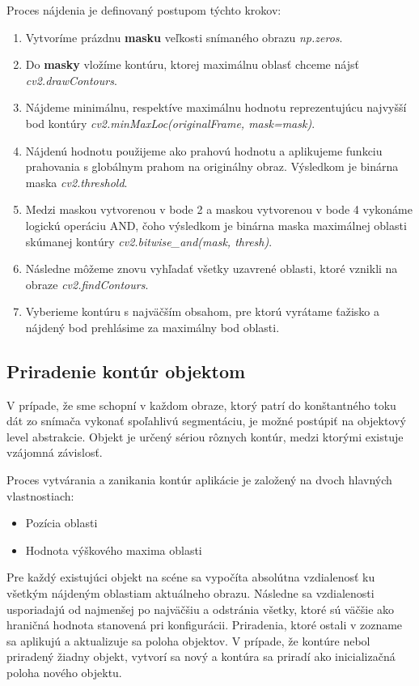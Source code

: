 Proces nájdenia je definovaný postupom týchto krokov: 
\begin{enumerate}
  \item Vytvoríme prázdnu \textbf{masku} veľkosti snímaného obrazu \textit{np.zeros}.
  \item Do \textbf{masky} vložíme kontúru, ktorej maximálnu oblasť chceme nájsť \textit{cv2.drawContours}.
  \item Nájdeme minimálnu, respektíve maximálnu hodnotu reprezentujúcu najvyšší bod kontúry  \textit{cv2.minMaxLoc(originalFrame, mask=mask)}.
  \item Nájdenú hodnotu použijeme ako prahovú hodnotu a aplikujeme funkciu prahovania s globálnym prahom na originálny obraz. Výsledkom je binárna maska \textit{cv2.threshold}.
  \item Medzi maskou vytvorenou v bode 2 a maskou vytvorenou v bode 4 vykonáme logickú operáciu AND, čoho výsledkom je binárna maska maximálnej oblasti skúmanej kontúry \textit{cv2.bitwise\_and(mask, thresh)}.
  \item Následne môžeme znovu vyhľadať všetky uzavrené oblasti, ktoré vznikli na obraze \textit{cv2.findContours}.
  \item Vyberieme kontúru s najväčším obsahom, pre ktorú vyrátame ťažisko a nájdený bod prehlásime za maximálny bod oblasti.
\end{enumerate}

\subsection{Priradenie kontúr objektom}
V prípade, že sme schopní v každom obraze, ktorý patrí do konštantného toku dát zo snímača vykonať spoľahlivú segmentáciu, je možné postúpiť na objektový level abstrakcie. Objekt je určený sériou rôznych kontúr, medzi ktorými existuje vzájomná závislosť.  

Proces vytvárania a zanikania kontúr aplikácie je založený na dvoch hlavných vlastnostiach:
\begin{itemize}
    \item Pozícia oblasti
    \item Hodnota výškového maxima oblasti
\end{itemize}

Pre každý existujúci objekt na scéne sa vypočíta absolútna vzdialenosť ku všetkým nájdeným oblastiam aktuálneho obrazu. Následne sa vzdialenosti usporiadajú od najmenšej po najväčšiu a odstránia všetky, ktoré sú väčšie ako hraničná hodnota stanovená pri konfigurácii. Priradenia, ktoré ostali v zozname sa aplikujú a aktualizuje sa poloha objektov. V prípade, že kontúre nebol priradený žiadny objekt, vytvorí sa nový a kontúra sa priradí ako inicializačná poloha nového objektu. 

